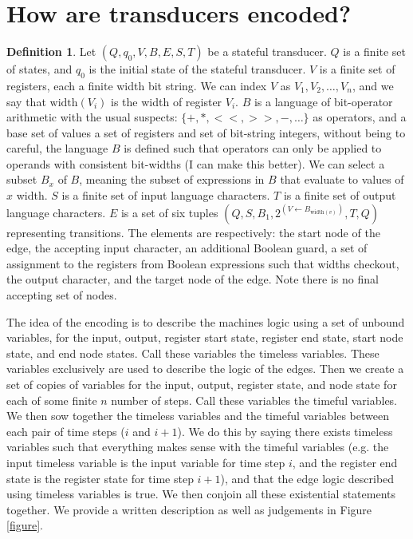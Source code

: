 \documentclass{article}
\newcommand{\width}{\text{width}}
\newcommand{\from}{\leftarrow}
\theoremstyle{definition}
\newtheorem{definition}{Definition}[section]
\begin{document}
\section{How are transducers encoded?}
\begin{definition}
Let $(Q, q_0, V, B, E, S, T)$ be a stateful transducer. 
$Q$ is a finite set of states, and $q_0$ is the initial state of the stateful transducer.
$V$ is a finite set of registers, each a finite width bit string. 
We can index $V$ as $V_1, V_2, \ldots, V_n$,
and we say that $\width(V_i)$ is the width of register $V_i$.
$B$ is a language of bit-operator arithmetic with the usual suspects: $\{+, *, <<, >>, -, \ldots \}$ as operators,
and a base set of values a set of registers and set of bit-string integers,
without being to careful, the language $B$ is defined such that operators can only be applied to operands with consistent bit-widths (I can make this better).
We can select a subset $B_x$ of $B$, meaning the subset of expressions in $B$ that evaluate to values of $x$ width.
$S$ is a finite set of input language characters.
$T$ is a finite set of output language characters. 
$E$ is a set of six tuples $(Q, S, B_1, 2^{(V \from B_{\width(v)})}, T, Q)$ representing transitions.
The elements are respectively:
the start node of the edge,
the accepting input character,
an additional Boolean guard,
a set of assignment to the registers from Boolean expressions such that widths checkout,
the output character,
and the target node of the edge.
Note there is no final accepting set of nodes.
\end{definition}

The idea of the encoding is to describe the machines logic using a set of unbound variables,
for the input, output, register start state, register end state, start node state, and end node states.
Call these variables the timeless variables.
These variables exclusively are used to describe the logic of the edges.
Then we create a set of copies of variables for the input, output, register state, and node state
for each of some finite $n$ number of steps.
Call these variables the timeful variables.
We then sow together the timeless variables and the timeful variables between each pair of time steps ($i$ and $i+1$).
We do this by saying there exists timeless variables such that everything makes sense with the timeful variables
(e.g. the input timeless variable is the input variable for time step $i$,
and the register end state is the register state for time step $i+1$),
and that the edge logic described using timeless variables is true.
We then conjoin all these existential statements together.
We provide a written description as well as judgements in Figure \ref{figure}.
\end{document}

